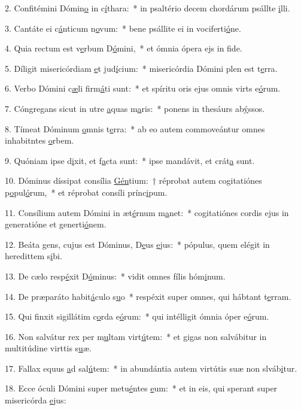 2. Confitémini Dómin\uline{o} in c\uline{í}thara:~* in psaltério decem chordárum psállte \uline{i}lli.\par 
3. Cantáte ei c\uline{á}nticum n\uline{o}vum:~* bene psállite ei in vociferti\uline{ó}ne.\par 
4. Quia rectum est v\uline{e}rbum D\uline{ó}mini,~* et ómnia ópera ejs in f\uline{i}de.\par 
5. Díligit misericórdiam \uline{e}t jud\uline{í}cium:~* misericórdia Dómini plen est t\uline{e}rra.\par 
6. Verbo Dómini c\uline{æ}li firm\uline{á}ti sunt:~* et spíritu oris ejus omnis virts e\uline{ó}rum.\par 
7. Cóngregans sicut in utre \uline{a}quas m\uline{a}ris:~* ponens in thesáurs ab\uline{ý}ssos.\par 
8. Tímeat Dóminum \uline{o}mnis t\uline{e}rra:~* ab eo autem commoveántur omnes inhabitntes \uline{o}rbem.\par 
9. Quóniam ipse d\uline{i}xit, et f\uline{a}cta sunt:~* ipse mandávit, et crát\uline{a} sunt.\par 
10. Dóminus díssipat consília \uline{Gén}tium:~† réprobat autem cogitatiónes p\uline{o}pul\uline{ó}rum,~* et réprobat consíli prínc\uline{i}pum.\par 
11. Consílium autem Dómini in æt\uline{é}rnum m\uline{a}net:~* cogitatiónes cordis ejus in generatióne et generti\uline{ó}nem.\par 
12. Beáta gens, cujus est Dóminus, D\uline{e}us \uline{e}jus:~* pópulus, quem elégit in heredittem s\uline{i}bi.\par 
13. De cælo resp\uline{é}xit D\uline{ó}minus:~* vidit omnes fílis hóm\uline{i}num.\par 
14. De præparáto habit\uline{á}culo s\uline{u}o~* respéxit super omnes, qui hábtant t\uline{e}rram.\par 
15. Qui finxit sigillátim c\uline{o}rda e\uline{ó}rum:~* qui intélligit ómnia óper e\uline{ó}rum.\par 
16. Non salvátur rex per m\uline{u}ltam virt\uline{ú}tem:~* et gigas non salvábitur in multitúdine virttis s\uline{u}æ.\par 
17. Fallax equus \uline{a}d sal\uline{ú}tem:~* in abundántia autem virtútis suæ non slváb\uline{i}tur.\par 
18. Ecce óculi Dómini super metu\uline{é}ntes \uline{e}um:~* et in eis, qui sperant super misericórda \uline{e}jus:\par 
